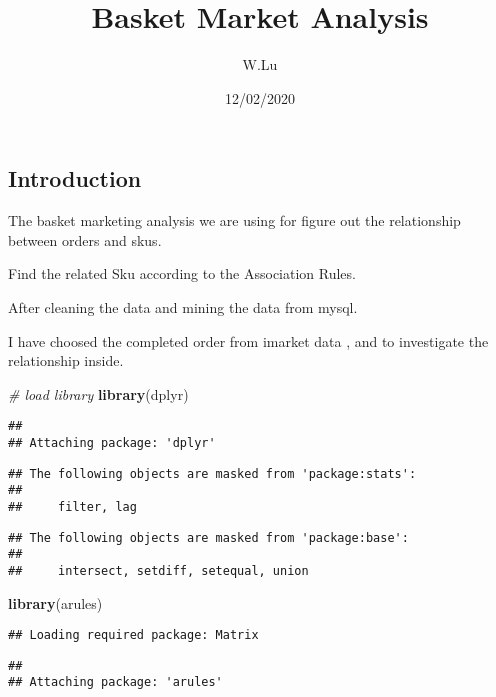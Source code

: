 \documentclass[
]{article}
\title{Basket Market Analysis}
\author{W.Lu}
\date{12/02/2020}
\newenvironment{Shaded}{\begin{snugshade}}{\end{snugshade}}
\newcommand{\CommentTok}[1]{\textcolor[rgb]{0.56,0.35,0.01}{\textit{#1}}}
\newcommand{\KeywordTok}[1]{\textcolor[rgb]{0.13,0.29,0.53}{\textbf{#1}}}
\newcommand{\NormalTok}[1]{#1}
\begin{document}
\maketitle

\hypertarget{introduction}{%
\subsection{Introduction}\label{introduction}}

The basket marketing analysis we are using for figure out the
relationship between orders and skus.

Find the related Sku according to the Association Rules.

After cleaning the data and mining the data from mysql.

I have choosed the completed order from imarket data , and to
investigate the relationship inside.

\begin{Shaded}
\begin{Highlighting}[]
\CommentTok{# load library}
\KeywordTok{library}\NormalTok{(dplyr)}
\end{Highlighting}
\end{Shaded}

\begin{verbatim}
## 
## Attaching package: 'dplyr'
\end{verbatim}

\begin{verbatim}
## The following objects are masked from 'package:stats':
## 
##     filter, lag
\end{verbatim}

\begin{verbatim}
## The following objects are masked from 'package:base':
## 
##     intersect, setdiff, setequal, union
\end{verbatim}

\begin{Shaded}
\begin{Highlighting}[]
\KeywordTok{library}\NormalTok{(arules)}
\end{Highlighting}
\end{Shaded}

\begin{verbatim}
## Loading required package: Matrix
\end{verbatim}

\begin{verbatim}
## 
## Attaching package: 'arules'
\end{verbatim}
\end{document}
